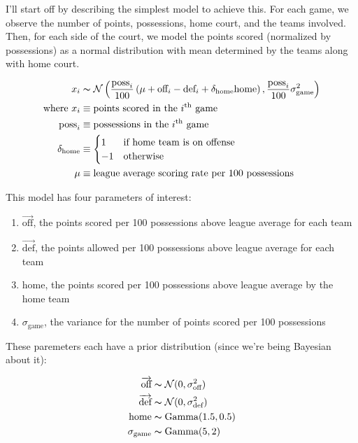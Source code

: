\documentclass[12 pt]{article}
\begin{document}
\begin{flushleft}

I’ll start off by describing the simplest model to achieve this.
For each game, we observe the number of points, possessions, home court, and the teams involved.
Then, for each side of the court, we model the points scored (normalized by possessions) as a normal distribution with mean determined by the teams along with home court.

\begin{align}
x_i &\thicksim \mathcal{N}\left(\frac{\text{poss}_i}{100} \left( \mu + \text{off}_i - \text{def}_i + \delta_\text{home} \text{home} \right), \frac{\text{poss}_i}{100}\sigma_{\text{game}}^2 \right) \notag \\
\text{where } x_i &\equiv \text{points scored in the }i^\text{th} \text{ game} \notag \\
\text{poss}_i &\equiv \text{possessions in the }i^\text{th} \text{ game} \notag \\
\delta_\text{home} &\equiv \begin{cases} 1 & \text{if home team is on offense} \\ -1 & \text{otherwise} \end{cases} \notag \\
\mu &\equiv \text{league average scoring rate per 100 possessions} \notag
\end{align}

This model has four parameters of interest:

\begin{enumerate}
\item{$ \overrightarrow{\text{off}} $, the points scored per 100 possessions above league average for each team}
\item{$ \overrightarrow{\text{def}} $, the points allowed per 100 possessions above league average for each team}
\item{$ \text{home} $, the points scored per 100 possessions above league average by the home team}
\item{$ \sigma_{\text{game}} $, the variance for the number of points scored per 100 possessions}
\end{enumerate}

These paremeters each have a prior distribution (since we're being Bayesian about it):

\begin{align}
    \overrightarrow{\text{off}} &\thicksim \mathcal{N}(0, \sigma_{\text{off}} ^ 2) \notag \\
    \overrightarrow{\text{def}} &\thicksim \mathcal{N}(0, \sigma_{\text{def}} ^ 2) \notag \\
    \text{home} &\thicksim \text{Gamma}(1.5, 0.5) \notag \\
    \sigma_{\text{game}} &\thicksim \text{Gamma}(5, 2) \notag
\end{align}


\end{flushleft}
\end{document}
